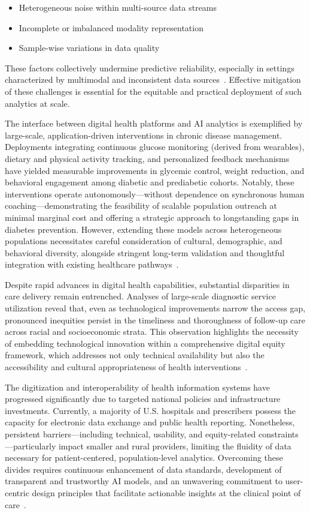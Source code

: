 \documentclass[sigconf]{acmart}
\begin{document}
\begin{itemize}
    \item Heterogeneous noise within multi-source data streams
    \item Incomplete or imbalanced modality representation
    \item Sample-wise variations in data quality
\end{itemize}
These factors collectively undermine predictive reliability, especially in settings characterized by multimodal and inconsistent data sources~\cite{ref78}. Effective mitigation of these challenges is essential for the equitable and practical deployment of such analytics at scale.

The interface between digital health platforms and AI analytics is exemplified by large-scale, application-driven interventions in chronic disease management. Deployments integrating continuous glucose monitoring (derived from wearables), dietary and physical activity tracking, and personalized feedback mechanisms have yielded measurable improvements in glycemic control, weight reduction, and behavioral engagement among diabetic and prediabetic cohorts. Notably, these interventions operate autonomously—without dependence on synchronous human coaching—demonstrating the feasibility of scalable population outreach at minimal marginal cost and offering a strategic approach to longstanding gaps in diabetes prevention. However, extending these models across heterogeneous populations necessitates careful consideration of cultural, demographic, and behavioral diversity, alongside stringent long-term validation and thoughtful integration with existing healthcare pathways~\cite{ref69}.

Despite rapid advances in digital health capabilities, substantial disparities in care delivery remain entrenched. Analyses of large-scale diagnostic service utilization reveal that, even as technological improvements narrow the access gap, pronounced inequities persist in the timeliness and thoroughness of follow-up care across racial and socioeconomic strata. This observation highlights the necessity of embedding technological innovation within a comprehensive digital equity framework, which addresses not only technical availability but also the accessibility and cultural appropriateness of health interventions~\cite{ref85}.

The digitization and interoperability of health information systems have progressed significantly due to targeted national policies and infrastructure investments. Currently, a majority of U.S. hospitals and prescribers possess the capacity for electronic data exchange and public health reporting. Nonetheless, persistent barriers—including technical, usability, and equity-related constraints—particularly impact smaller and rural providers, limiting the fluidity of data necessary for patient-centered, population-level analytics. Overcoming these divides requires continuous enhancement of data standards, development of transparent and trustworthy AI models, and an unwavering commitment to user-centric design principles that facilitate actionable insights at the clinical point of care~\cite{ref82,ref84}.
\end{document}
